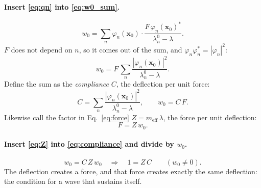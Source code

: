 \paragraph{Insert \eqref{eq:qn} into \eqref{eq:w0_sum}.}
\begin{equation}
  w_0 = \sum_n \varphi_n(\mathbf{x}_0)\cdot\frac{F\,\varphi_n(\mathbf{x}_0)^*}{\lambda_n^0 - \lambda} .
\end{equation}
$F$ does not depend on $n$, so it comes out of the sum, and
$\varphi_n\varphi_n^* = |\varphi_n|^2$:
\begin{equation}
  w_0 = F\,\sum_n \frac{|\varphi_n(\mathbf{x}_0)|^2}{\lambda_n^0 - \lambda} .
\end{equation}
Define the sum as the \emph{compliance} $C$, the deflection per unit force:
\begin{equation}
  C = \sum_n \frac{|\varphi_n(\mathbf{x}_0)|^2}{\lambda_n^0 - \lambda} ,
  \qquad
  w_0 = C\,F .
  \label{eq:compliance}
\end{equation}
Likewise call the factor in Eq.~\eqref{eq:force} $Z = m_\mathrm{eff}\,\lambda$,
the force per unit deflection:
\begin{equation}
  F = Z\, w_0 .
  \label{eq:Z}
\end{equation}

\paragraph{Insert \eqref{eq:Z} into \eqref{eq:compliance} and divide by $w_0$.}
\begin{equation}
  w_0 = C\, Z\, w_0
  \quad\Longrightarrow\quad
  1 = Z\, C \qquad (w_0 \neq 0).
  \label{eq:ZC}
\end{equation}
The deflection creates a force, and that force creates exactly the same
deflection: the condition for a wave that sustains itself.

